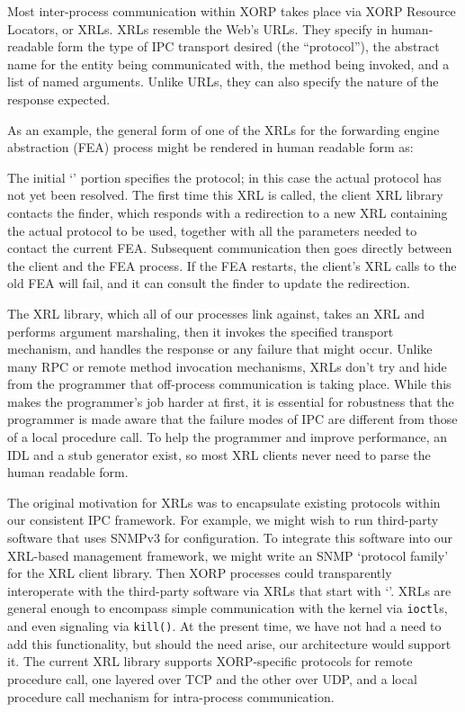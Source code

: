 Most inter-process communication within XORP takes place via XORP
Resource Locators, or XRLs.  XRLs resemble the Web's URLs. They specify in
human-readable form the type of IPC transport desired (the
``protocol''), the abstract name for the entity being communicated
with, the method being invoked, and a list of named arguments.  Unlike
URLs, they can also specify the nature of the response expected.

As an example, the general form of one of the XRLs for the forwarding
engine abstraction (FEA) process might be rendered in human readable
form as:
%
\begin{figure}[h]
\vspace{-0.05in}
\centerline{}
\vspace{-0.1in}
\end{figure}

\noindent The initial `' portion specifies the protocol;
in this case the actual protocol has not yet been resolved.
The first time this XRL is called, the client XRL library
contacts the finder, which responds with a redirection to a new XRL
containing the actual protocol to be used, together with all the
parameters needed to contact the current FEA.
Subsequent communication then goes
directly between the client and the FEA process.
If the FEA restarts, the client's XRL calls to the old FEA will fail, and
it can consult the finder to update the redirection.

The XRL library, which all of our processes link against, takes an XRL
and performs argument marshaling, then it invokes the specified transport
mechanism, and handles the response or any
failure that might occur.  Unlike many RPC or remote method invocation
mechanisms, XRLs don't try and hide from the programmer that
off-process communication is taking place.  While this makes the
programmer's job harder at first, it is essential for robustness that
the programmer is made aware that the failure modes of IPC are different from those of
a local procedure call.  
To help the programmer and improve performance, an IDL and a stub
generator exist, so most XRL clients never need to parse the human
readable form.

The original motivation for XRLs was to encapsulate existing
protocols within our consistent IPC framework.   For example, we
might wish to run third-party software that uses SNMPv3 for
configuration. 
To integrate this software into our XRL-based management framework, we
might write an SNMP `protocol family' for the XRL client library.
Then XORP processes could transparently interoperate with the third-party
software via XRLs that start with `'.
XRLs are general enough to encompass simple
communication with the kernel via \texttt{ioctl}s, and even signaling
via \texttt{kill()}.  At the present time, we have not had a need to
add this functionality, but should the need arise, our architecture
would support it.  The current XRL library supports
XORP-specific protocols for remote procedure call, one layered over
TCP and the other over UDP, and a local procedure call mechanism for
intra-process communication.

